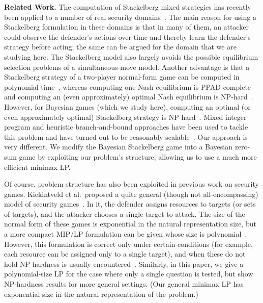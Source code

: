 \documentclass{article}
\begin{document}
{\bf Related Work.}
The computation of Stackelberg mixed strategies has recently been
applied to a number of real security
domains~\cite{Pita08:Using,Tsai09:IRIS,Shieh12:PROTECT,Yin12:TRUSTS}.
The main reason
for using a Stackelberg formulation in these domains is that in many
of them, an attacker could observe the defender's actions over time
and thereby learn the defender's strategy before acting; the same can
be argued for the domain that we are studying here.  The Stackelberg
model also largely avoids the possible equilibrium selection problems
of a simultaneous-move model.  Another advantage is that a Stackelberg
strategy of a two-player normal-form game can be computed in
polynomial time~\cite{Conitzer06:Computing,Stengel10:Leadership},
whereas computing one Nash equilibrium is
PPAD-complete~\cite{Daskalakis09:Complexity,Chen09:Settling} and
computing an (even approximately) optimal
Nash equilibrium is NP-hard~\cite{Gilboa89:Nash,Conitzer03:Nash}.
However, for Bayesian games
(which we study here), computing an optimal (or even approximately
optimal) Stackelberg strategy is
NP-hard~\cite{Conitzer06:Computing,Letchford09:Learning}.  Mixed integer program
and heuristic branch-and-bound approaches have been used to tackle
this problem and have turned out to be reasonably
scalable~\cite{Paruchuri08:Bayesian,Jain11:Quality}. Our approach is
very
different. We modify the Bayesian Stackelberg game into a Bayesian
zero-sum game by exploiting our problem's structure, allowing us to
use a much more efficient minimax LP.

Of course, problem structure has also been exploited in previous work
on security games.
Kiekintveld et al.~proposed a quite general (though not
all-encompassing) model of security games~\cite{Kiekintveld09:Computing}.
In it, the defender assigns resources to targets (or sets of targets),
and the attacker chooses a single target to attack.  The size of the
normal form of these games is exponential in the natural
representation size, but a more compact MIP/LP formulation can be
given whose size is polynomial~\cite{Kiekintveld09:Computing}.
However, this formulation is
correct only under certain conditions (for example, each resource can
be assigned only to a single target), and when these do not hold
NP-hardness is usually
encountered~\cite{Korzhyk10:Complexity,Letchford13:Solving}.
Similarly, in this paper,
we give a polynomial-size LP for the case where only a single question
is tested, but show NP-hardness results for more general settings.  (Our
general minimax LP has exponential size in the natural representation
of the problem.)
\end{document}
